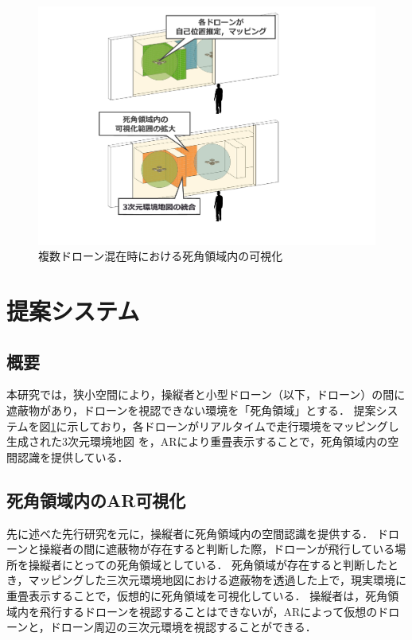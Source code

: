 \documentclass[a4paper,10pt,twocolumn,uplatex]{jsarticle}
\begin{document}

\begin{figure}[!tb]
  \centering
  \includegraphics[width=\linewidth]{img/outline.pdf}
  \caption{複数ドローン混在時における死角領域内の可視化}
  \label{fig:outline}
\end{figure}



\section{提案システム}
\subsection{概要}
本研究では，狭小空間により，操縦者と小型ドローン（以下，ドローン）の間に遮蔽物があり，ドローンを視認できない環境を「死角領域」とする．
提案システムを図\ref{fig:outline}に示しており，各ドローンがリアルタイムで走行環境をマッピングし生成された3次元環境地図
を，ARにより重畳表示することで，死角領域内の空間認識を提供している．
\par

\subsection{死角領域内のAR可視化}
先に述べた先行研究\cite{Erat}を元に，操縦者に死角領域内の空間認識を提供する．
ドローンと操縦者の間に遮蔽物が存在すると判断した際，ドローンが飛行している場所を操縦者にとっての死角領域としている．
死角領域が存在すると判断したとき，マッピングした三次元環境地図における遮蔽物を透過した上で，現実環境に重畳表示することで，仮想的に死角領域を可視化している．
操縦者は，死角領域内を飛行するドローンを視認することはできないが，ARによって仮想のドローンと，ドローン周辺の三次元環境を視認することができる．
\end{document}
